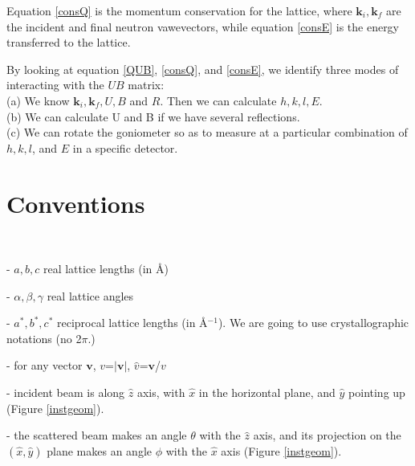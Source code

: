 \documentclass[prb]{revtex4}%
\begin{document}
Equation \ref{consQ} is the momentum conservation for the lattice, where $\textbf{k}_i, \textbf{k}_f$ are the
incident and final neutron vawevectors, while equation \ref{consE} is the energy transferred to the lattice.

By looking at equation \ref{QUB}, \ref{consQ}, and \ref{consE}, we identify three modes of interacting with the $UB$ matrix:\\
\hspace*{0.25 in} (a) We know $\textbf{k}_i, \textbf{k}_f, U, B$ and $R$. Then we can calculate $h, k, l, E$.\\
\hspace*{0.25 in} (b) We can calculate U and B if we have several reflections.\\
\hspace*{0.25 in} (c) We can rotate the goniometer so as to measure at a particular combination of $h, k, l$, and $E$ in a specific detector.

\section{Conventions}

\

- $a, b, c$ real lattice lengths (in \AA)

- $\alpha, \beta, \gamma$ real lattice angles

- $a^*, b^*, c^*$ reciprocal lattice lengths (in \AA$^{-1}$). We are going to use crystallographic notations (no 2$\pi$.)

- for any vector $\textbf{v}$, $v$=$|\textbf{v}|$, $\widehat{v}$=$\textbf{v}$/$v$

- incident beam is along $\widehat{z}$ axis, with $\widehat{x}$ in the horizontal plane, and $\widehat{y}$ pointing up (Figure \ref{instgeom}).

- the scattered beam makes an angle $\theta$ with the $\widehat{z}$ axis, and its projection on the  $(\widehat{x},\widehat{y})$ plane
makes an angle $\phi$ with the $\widehat{x}$ axis (Figure \ref{instgeom}).
\end{document}
